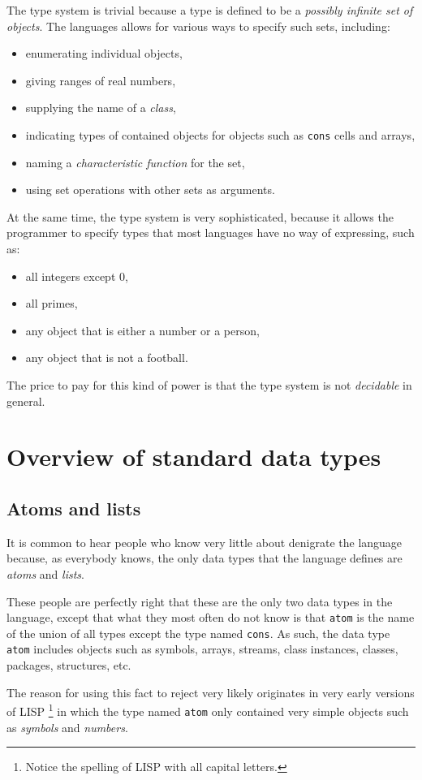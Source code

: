 The type system is trivial because a type is defined to be a
\emph{possibly infinite set of objects}.  The languages allows for
various ways to specify such sets, including:

\begin{itemize}
\item enumerating individual objects,
\item giving ranges of real numbers,
\item supplying the name of a \emph{class},
\item indicating types of contained objects for objects such as
  \texttt{cons} cells and arrays,
\item naming a \emph{characteristic function} for the set,
\item using set operations with other sets as arguments.
\end{itemize}

At the same time, the type system is very sophisticated, because it
allows the programmer to specify types that most languages have no way
of expressing, such as:

\begin{itemize}
\item all integers except 0,
\item all primes,
\item any object that is either a number or a person,
\item any object that is not a football.
\end{itemize}

The price to pay for this kind of power is that the \commonlisp{} type
system is not \emph{decidable} in general.

\section{Overview of standard data types}
\label{sec-overview-of-standard-data-types}

\subsection{Atoms and lists}
\label{sec-atoms-and-lists}

It is common to hear people who know very little about \commonlisp{}
denigrate the language because, as everybody knows, the only data
types that the language defines are \emph{atoms} and \emph{lists}. 

These people are perfectly right that these are the only two data
types in the language, except that what they most often do not know is
that \texttt{atom} is the name of the union of all \commonlisp{} types
except the type named \texttt{cons}.  As such, the data type
\texttt{atom} includes objects such as symbols, arrays, streams, class
instances, classes, packages, structures, etc.

The reason for using this fact to reject \commonlisp{} very likely
originates in very early versions of LISP%
\footnote{Notice the spelling of LISP with all capital letters.} in
which the type named \texttt{atom} only contained very simple
objects such as \emph{symbols} and \emph{numbers}.
